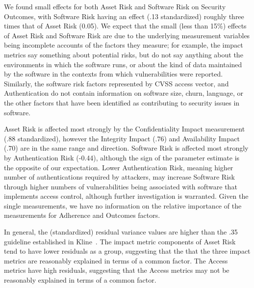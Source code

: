 We found small effects for both Asset Risk and Software Risk on Security Outcomes, with Software Risk having an effect (.13 standardized) roughly three times that of Asset Risk (0.05). We expect that the small (less than 15\%) effects of Asset Risk and Software Risk are due to the underlying measurement variables being incomplete accounts of the factors they measure; for example, the impact metrics say something about potential risks, but do not say anything about the environments in which the software runs, or about the kind of data maintained by the software in the contexts from which vulnerabilities were reported. Similarly, the software risk factors represented by CVSS access vector, and Authentication do not contain information on software size, churn, language, or the other factors that have been identified as contributing to security issues in software. 

Asset Risk is affected most strongly by the Confidentiality Impact measurement (.88 standardized), however the Integrity Impact (.76) and Availability Impact (.70) are in the same range and direction. Software Risk is affected most strongly by Authentication Risk (-0.44), although the sign of the parameter estimate is the opposite of our expectation. Lower Authentication Risk, meaning higher number of authentications required by attackers, may increase Software Risk through higher numbers of vulnerabilities being associated with software that implements access control, although further investigation is warranted. Given the single measurements, we have no information on the relative importance of the measurements for Adherence and Outcomes factors.

In general, the (standardized) residual variance values are higher than the .35 guideline established in Kline~\cite{kline2015principles}. The impact metric components of Asset Risk tend to have lower residuals as a group, suggesting that the that the three impact metrics are reasonably explained in terms of a common factor. The Access metrics have high residuals, suggesting that the Access metrics may not be reasonably explained in terms of a common factor. 

